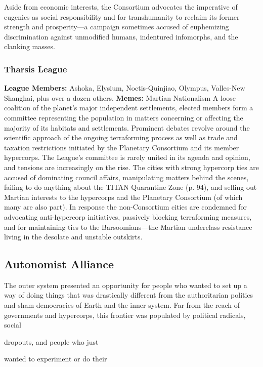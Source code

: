 Aside from economic interests, the Consortium 
advocates the imperative of eugenics as social responsibility
and for transhumanity to reclaim its
former strength and prosperity—a campaign sometimes
accused of euphemizing discrimination against
unmodified humans, indentured infomorphs, and the 
clanking masses.

\subsubsection{Tharsis League}

\textbf{League Members:} Ashoka, Elysium, Noctis-Quinjiao, 
Olympus, Valles-New Shanghai, plus over a 
dozen others.
\textbf{Memes:} Martian Nationalism
A loose coalition of the planet's major independent 
settlements, elected members form a committee representing
the population in matters concerning or
affecting the majority of its habitats and settlements. 
Prominent debates revolve around the scientific approach
of the ongoing terraforming process as well
as trade and taxation restrictions initiated by the 
Planetary Consortium and its member hypercorps. 
The League's committee is rarely united in its agenda 
and opinion, and tensions are increasingly on the rise. 
The cities with strong hypercorp ties are accused of 
dominating council affairs, manipulating matters 
behind the scenes, failing to do anything about the 
TITAN Quarantine Zone (p. 94), and selling out 
Martian interests to the hypercorps and the Planetary 
Consortium (of which many are also part). In response
the non-Consortium cities are condemned for
advocating anti-hypercorp initiatives, passively blocking
terraforming measures, and for maintaining ties to
the Barsoomians—the Martian underclass resistance 
living in the desolate and unstable outskirts.

\subsection{Autonomist Alliance}

The outer system presented an opportunity for people 
who wanted to set up a way of doing things that was 
drastically different from the authoritarian politics 
and sham democracies of Earth and the inner system. 
Far from the reach of governments and hypercorps, 
this frontier was populated by political radicals, social 

dropouts, and people who just 

wanted to experiment or do their 

